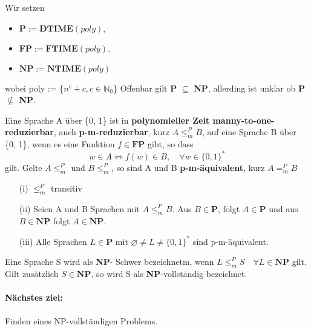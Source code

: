 {}

    Wir setzen 
    \begin{itemize}
        \item \(\textbf{P} := \textbf{DTIME} (poly),\)
        \item \(\textbf{FP} := \textbf{FTIME}(poly),\)
        \item \(\textbf{NP} := \textbf{NTIME}(poly)\)
    \end{itemize}
    wobei poly := \{\(n^c + c, c \in \mathbb{N}_0\)\}
    Offenbar gilt \textbf{P} \(\subseteq\) \textbf{NP}, allerding ist unklar ob \textbf{P} \(\not \subseteq\) \textbf{NP}.

    Eine Sprache A über \{0, 1\} ist in \textbf{polynomieller Zeit manny-to-one- reduzierbar}, auch \textbf{p-m-reduzierbar}, kurz \(A \leq^P_m B\), auf eine Sprache B über \{0, 1\}, wenn es eine Funktion \(f \in\textbf{FP}\) gibt, so dass 
    \[
        w\in A \Leftrightarrow f (w) \in B, \quad \forall w \in \{0, 1\}^*  
    \] 
    gilt. Gelte \(A \leq^P_m\) und \(B \leq^P_m\), so sind A und B \textbf{p-m-äquivalent}, kurz \(A=^P_m B\)

    \begin{itemize}
        \item [(i)] \(\leq^P_m\) transitiv
        \item [(ii)] Seien A und B Sprachen mit \(A \leq ^P_m B\). Aus \(B \in \textbf{P}\), folgt \(A \in \textbf{P}\) und aus \(B \in \textbf{NP}\) folgt \(A \in \textbf{NP}\).
        \item [(iii)] Alle Sprachen \(L \in \textbf{P}\) mit \(\varnothing \not = L \not = \{0,1\}^*\) sind p-m-äquivalent.
    \end{itemize}

    Eine Sprache S wird als \textbf{NP}- Schwer bezeichnetm, wenn \(L \leq ^P_m S \quad \forall L \in \textbf{NP}\) gilt. Gilt zusätzlich \(S \in \textbf{NP}\), so wird S als \textbf{NP}-vollständig bezeichnet.

    \paragraph*{Nächstes ziel:} 
        Finden eines NP-vollständigen Problems.

